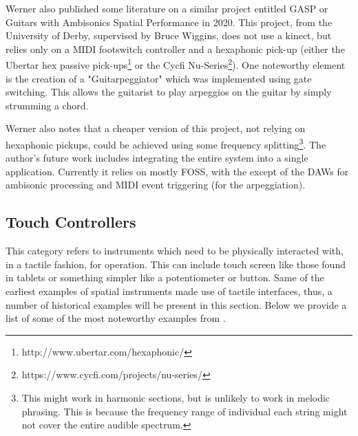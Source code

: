 Werner \cite{wernerdevelopment} also published some literature on a similar project entitled GASP or Guitars with Ambisonics Spatial Performance in 2020. This project, from the University of Derby, supervised by Bruce Wiggins, does not use a kinect, but relies only on a MIDI footswitch controller and a hexaphonic pick-up (either the Ubertar hex passive pick-ups\footnote{http://www.ubertar.com/hexaphonic/} or the Cycfi Nu-Series\footnote{https://www.cycfi.com/projects/nu-series/}). One noteworthy element is the creation of a "Guitarpeggiator" which was implemented using gate switching. This allows the guitarist to play arpeggios on the guitar by simply strumming a chord. 

Werner also notes that a cheaper version of this project, not relying on hexaphonic pickups, could be achieved using some frequency splitting\footnote{This might work in harmonic sections, but is unlikely to work in melodic phrasing. This is because the frequency range of individual each string might not cover the entire audible spectrum.}. The author's future work includes integrating the entire system into a single application. Currently it relies on mostly FOSS, with the except of the DAWs for ambisonic processing and MIDI event triggering (for the arpeggiation). 

\subsection{Touch Controllers} %

This category refers to instruments which need to be physically interacted with, in a tactile fashion, for operation. This can include touch screen like those found in tablets or something simpler like a potentiometer or button. Same of the earliest examples of spatial instruments made use of tactile interfaces, thus, a number of historical examples will be present in this section. Below we provide a list of some of the most noteworthy examples from \cite{pysiewicz2017instruments}.

